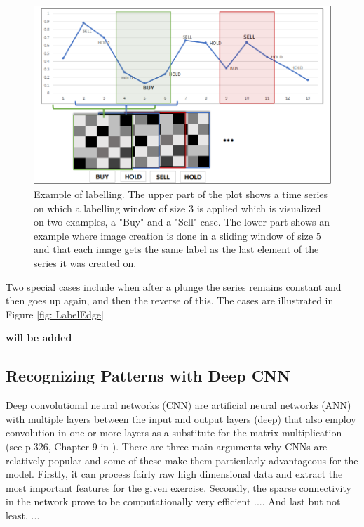 \documentclass[11pt, a4paper]{article}
\begin{document}
\begin{figure}[ht]
    \centering
    \includegraphics[width=\textwidth]{images/Labelling.png}
    \caption{Example of labelling. The upper part of the plot shows a time series on which a labelling window of size $3$ is applied which is visualized on two examples, a "Buy" and a "Sell" case. The lower part shows an example where image creation is done in a sliding window of size $5$ and that each image gets the same label as the last element of the series it was created on.}
    \label{fig:Labelling}
\end{figure}

Two special cases include when after a plunge the series remains constant and then goes up again, and then the reverse of this. The cases are illustrated in Figure \ref{fig: LabelEdge}

\textbf{will be added}

\subsection{Recognizing Patterns with Deep CNN}
\label{subsec:DM:RecPatwCNN}
Deep convolutional neural networks (CNN) are artificial neural networks (ANN) with multiple layers between the input and output layers (deep) that also employ convolution in one or more layers as a substitute for the matrix multiplication (see p.326, Chapter 9 in \cite{goodfellow2016deep}). %
There are three main arguments why CNNs are relatively popular and some of these make them particularly advantageous for the model.
Firstly, it can process fairly raw high dimensional data and extract the most important features for the given exercise. Secondly, the sparse connectivity in the network prove to be computationally very efficient .... And last but not least, ...
\end{document}
